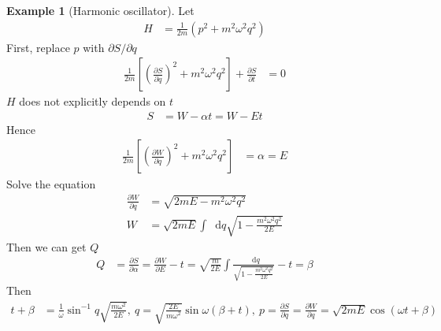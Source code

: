 \documentclass[twoside,9pt]{article}
\numberwithin{equation}{section} %
\newcommand{\lms}{\fontfamily{lmss}\selectfont} %
\renewcommand*\d{\mathop{}\!\mathrm{d}}
\theoremstyle{definition}
\newtheorem{example}{\lms Example}[section]
\theoremstyle{remark}
\begin{document}
\begin{example}[Harmonic oscillator]
Let
\begin{align*}
    H &= \frac{1}{2m}(p^2 + m^2\omega^2 q^2)
\end{align*}
First, replace $p$ with $\partial S/\partial q$
\begin{align*}
    \frac{1}{2m}\left[ 
        \left( \frac{\partial S}{\partial q} \right)^2
        + m^2\omega^2 q^2
    \right] + \frac{\partial S}{\partial t} &= 0
\end{align*}
$H$ does not explicitly depends on $t$
\begin{align*}
    S &= W - \alpha t = W - Et
\end{align*}
Hence
\begin{align*}
    \frac{1}{2m}\left[ \left( \frac{\partial W}{\partial q}\right)^2
    + m^2\omega^2 q^2 \right] &= \alpha = E
\end{align*}
Solve the equation
\begin{align*}
    \frac{\partial W}{\partial q} &= 
    \sqrt{2mE - m^2\omega^2 q^2}\\
    W &= \sqrt{2mE}\int \d q \sqrt{1 - \frac{m^2\omega^2 q^2}{2E}}
\end{align*}
Then we can get $Q$
\begin{align*}
    Q &= \frac{\partial S}{\partial \alpha} = \frac{\partial W}{\partial E} - t
    = \sqrt{\frac{m}{2E}}\int \frac{\d q}{\sqrt{1 - \frac{m^2\omega^2 q^2}{2E}}} - t
    = \beta
\end{align*}
Then
\begin{align*}
    t + \beta &= \frac{1}{\omega}\sin^{-1}q\sqrt{\frac{m\omega^2}{2E}},~
    q = \sqrt{\frac{2E}{m\omega^2}}\sin\omega(\beta + t),~
    p = \frac{\partial S}{\partial q} = \frac{\partial W}{\partial q}
    = \sqrt{2mE}\cos(\omega t + \beta)
\end{align*}
\end{example}
\end{document}
